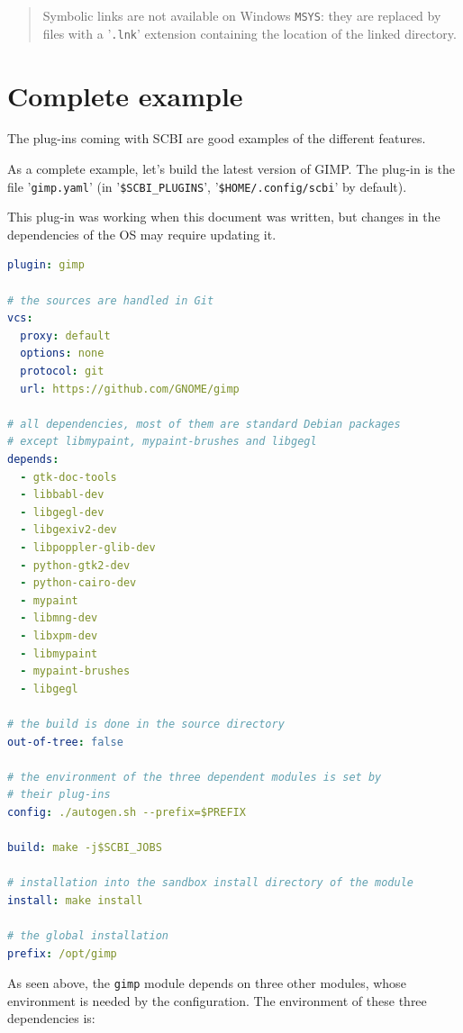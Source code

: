 \documentclass[a4paper,12pt,twoside]{article}
\newcommand{\code}[1]{\texttt{#1}}
\newcommand{\file}[1]{'{\texttt{#1}}'}
\let\stdsection\section
\renewcommand\section{\newpage\stdsection}
\begin{document}
\begin{quote}
	Symbolic links are not available on Windows \code{MSYS}: they are replaced by files with a \file{.lnk} extension containing the location of the linked directory.
\end{quote}

\section{Complete example}

The plug-ins coming with SCBI are good examples of the different features.

As a complete example, let's build the latest version of GIMP. The plug-in is the file \file{gimp.yaml} (in \file{\$SCBI\_PLUGINS}, \file{\$HOME/.config/scbi} by default).

This plug-in was working when this document was written, but changes in the dependencies of the OS may require updating it.

\begin{lstlisting}[language={yaml}]
plugin: gimp

# the sources are handled in Git
vcs:
  proxy: default
  options: none
  protocol: git
  url: https://github.com/GNOME/gimp

# all dependencies, most of them are standard Debian packages
# except libmypaint, mypaint-brushes and libgegl
depends:
  - gtk-doc-tools
  - libbabl-dev
  - libgegl-dev
  - libgexiv2-dev
  - libpoppler-glib-dev
  - python-gtk2-dev
  - python-cairo-dev
  - mypaint
  - libmng-dev
  - libxpm-dev
  - libmypaint
  - mypaint-brushes
  - libgegl

# the build is done in the source directory
out-of-tree: false

# the environment of the three dependent modules is set by
# their plug-ins
config: ./autogen.sh --prefix=$PREFIX

build: make -j$SCBI_JOBS

# installation into the sandbox install directory of the module
install: make install

# the global installation
prefix: /opt/gimp
\end{lstlisting}

As seen above, the \code{gimp} module depends on three other modules, whose environment is needed by the configuration. The environment of these three dependencies is:
\end{document}
